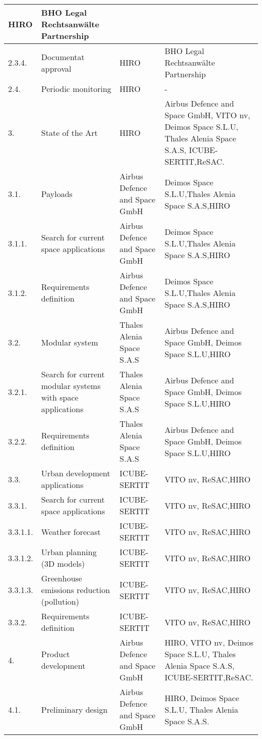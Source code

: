 \begin{longtable}[H]{l p{4cm} p{4cm} p{4cm}}
	HIRO&BHO Legal Rechtsanwälte Partnership
	\\ \midrule
	2.3.4. & Documentat approval &
	HIRO&BHO Legal Rechtsanwälte Partnership
	\\ \midrule
	2.4. & Periodic monitoring & HIRO&-
	\\ \midrule
	3. & State of the Art & HIRO& Airbus Defence and Space GmbH, VITO nv, Deimos Space S.L.U, Thales Alenia Space S.A.S, ICUBE-SERTIT,ReSAC.
	\\ \midrule
	3.1. & Payloads & Airbus Defence and Space GmbH&Deimos Space S.L.U,Thales Alenia Space S.A.S,HIRO
	\\ \midrule
	3.1.1. & Search for current space applications & Airbus Defence and Space GmbH&Deimos Space S.L.U,Thales Alenia Space S.A.S,HIRO
	\\ \midrule
	3.1.2. & Requirements definition & Airbus Defence and Space GmbH&Deimos Space S.L.U,Thales Alenia Space S.A.S,HIRO
	\\ \midrule
	3.2. & Modular system &Thales Alenia Space S.A.S&Airbus Defence and Space GmbH, Deimos Space S.L.U,HIRO
	\\ \midrule
	3.2.1. & Search for current modular systems with space applications&Thales Alenia Space S.A.S&Airbus Defence and Space GmbH, Deimos Space S.L.U,HIRO
	\\ \midrule
	3.2.2. & Requirements definition&Thales Alenia Space S.A.S&Airbus Defence and Space GmbH, Deimos Space S.L.U,HIRO
	\\ \midrule
	3.3. & Urban development applications &ICUBE-SERTIT&VITO nv, ReSAC,HIRO
	\\ \midrule
	3.3.1. & Search for current space applications &ICUBE-SERTIT&VITO nv, ReSAC,HIRO
	\\ \midrule
	3.3.1.1. & Weather forecast &ICUBE-SERTIT&VITO nv, ReSAC,HIRO
	\\ \midrule
	3.3.1.2. & Urban planning (3D models) &ICUBE-SERTIT&VITO nv, ReSAC,HIRO
	\\ \midrule
	3.3.1.3. & Greenhouse emissions reduction (pollution) &ICUBE-SERTIT&VITO nv, ReSAC,HIRO
	\\ \midrule
	3.3.2. & Requirements definition &ICUBE-SERTIT&VITO nv, ReSAC,HIRO
	\\ \midrule
	4. & Product development &Airbus Defence and Space GmbH& HIRO, VITO nv, Deimos Space S.L.U, Thales Alenia Space S.A.S, ICUBE-SERTIT,ReSAC.
	\\ \midrule
	4.1. & Preliminary design &
	Airbus Defence and Space GmbH& HIRO, Deimos Space S.L.U, Thales Alenia Space S.A.S.

\end{longtable}

